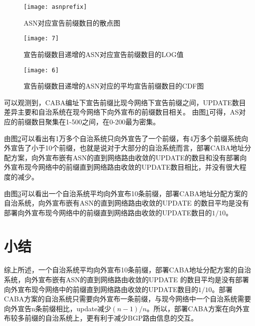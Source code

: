 \begin{figure}
  \centering
  \texttt{[image: asnprefix]}\\
  \caption{ASN对应宣告前缀数目的散点图}\label{fig:asnprefix}
\end{figure}

\begin{figure}
  \centering
  \texttt{[image: 7]}\\
  \caption{宣告前缀数目递增的ASN对应宣告前缀数目的LOG值}\label{fig:7}
\end{figure}

\begin{figure}
  \centering
  \texttt{[image: 6]}\\
  \caption{宣告前缀数目递增的ASN对应的平均宣告前缀数目的CDF图}\label{fig:6}
\end{figure}

可以观测到，CABA编址下宣告前缀比现今网络下宣告前缀之间，UPDATE数目差异主要和自治系统在现今网络下向外宣布的前缀数目相关。
由图\ref{fig:asnprefix}可得，AS对应的前缀数目聚集在1-500之间，在0-200最为密集。

由图\ref{fig:7}可以看出有1万多个自治系统只向外宣告了一个前缀，有4万多个前缀系统向外宣告了小于10个前缀，也就是说对于大部分的自治系统而言，部署CABA地址分配方案，向外宣布嵌有ASN的直到网络路由收敛的UPDATE的数目和没有部署向外宣布现今网络中的前缀直到网络路由收敛的UPDATE数目相比，并没有很大程度的减少。

由图\ref{fig:6}可以看出一个自治系统平均向外宣布10条前缀，部署CABA地址分配方案的自治系统，向外宣布嵌有ASN的直到网络路由收敛的UPDATE 的数目平均是没有部署向外宣布现今网络中的前缀直到网络路由收敛的UPDATE数目的$1/10$。



\section{小结}
综上所述，一个自治系统平均向外宣布10条前缀，部署CABA地址分配方案的自治系统，向外宣布嵌有ASN的直到网络路由收敛的UPDATE 的数目平均是没有部署向外宣布现今网络中的前缀直到网络路由收敛的UPDATE数目的$1/10$。部署CABA方案的自治系统只需要向外宣布一条前缀，与现今网络中一个自治系统需要向外宣告n条前缀相比，update减少$(n-1)/n$。所以，部署CABA方案在向外宣布较多前缀的自治系统上，更有利于减少BGP路由信息的交互。

